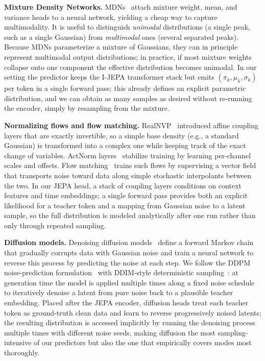 \documentclass[conference]{IEEEtran}
\begin{document}
\textbf{Mixture Density Networks.}
MDNs~\cite{bishop1994mdn} attach mixture weight, mean, and variance heads to a neural network, yielding a cheap way to capture multimodality.
It is useful to distinguish \emph{unimodal} distributions (a single peak, such as a single Gaussian) from \emph{multimodal} ones (several separated peaks).
Because MDNs parameterize a mixture of Gaussians, they can in principle represent multimodal output distributions; in practice, if most mixture weights collapse onto one component the effective distribution becomes unimodal.
In our setting the predictor keeps the I-JEPA transformer stack but emits $(\pi_k,\mu_k,\sigma_k)$ per token in a single forward pass; this already defines an explicit parametric distribution, and we can obtain as many samples as desired without re-running the encoder, simply by resampling from the mixture.

\textbf{Normalizing flows and flow matching.}
RealNVP~\cite{dinh2017realnvp} introduced affine coupling layers that are exactly invertible, so a simple base density (e.g., a standard Gaussian) is transformed into a complex one while keeping track of the exact change of variables.
ActNorm layers~\cite{kingma2018glow} stabilize training by learning per-channel scales and offsets.
Flow matching~\cite{lipman2023flowmatching} trains such flows by supervising a vector field that transports noise toward data along simple stochastic interpolants between the two.
In our JEPA head, a stack of coupling layers conditions on context features and time embeddings; a single forward pass provides both an explicit likelihood for a teacher token and a mapping from Gaussian noise to a latent sample, so the full distribution is modeled analytically after one run rather than only through repeated sampling.

\textbf{Diffusion models.}
Denoising diffusion models~\cite{ho2020ddpm,song2021ddim} define a forward Markov chain that gradually corrupts data with Gaussian noise and train a neural network to reverse this process by predicting the noise at each step.
We follow the DDPM noise-prediction formulation~\cite{ho2020ddpm} with DDIM-style deterministic sampling~\cite{song2021ddim}: at generation time the model is applied multiple times along a fixed noise schedule to iteratively denoise a latent from pure noise back to a plausible teacher embedding.
Placed after the JEPA encoder, diffusion heads treat each teacher token as ground-truth clean data and learn to reverse progressively noised latents; the resulting distribution is accessed implicitly by running the denoising process multiple times with different noise seeds, making diffusion the most sampling-intensive of our predictors but also the one that empirically covers modes most thoroughly.
\end{document}
